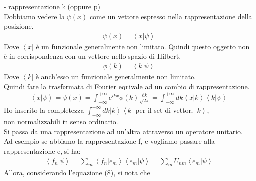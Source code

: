\begin{flushleft}
- rappresentazione k (oppure p)\\
Dobbiamo vedere la $\psi\left(x\right)$ come un vettore espresso nella rappresentazione della posizione.\\
\begin{equation}\begin{split}
\psi\left(x\right)=\left\langle x|\psi\right\rangle
\end{split}\end{equation}
Dove $\left\langle x\right|$ è un funzionale generalmente non limitato. Quindi questo oggetto non è in corrispondenza con un vettore nello spazio di Hilbert.
\begin{equation}\begin{split}
\phi \left(k\right)=\left\langle k|\psi\right\rangle
\end{split}\end{equation}
Dove $\left\langle k\right|$ è anch'esso un funzionale generalmente non limitato.\\
Quindi fare la trasformata di Fourier equivale ad un cambio di rappresentazione.
\begin{equation}\begin{split}
\left\langle x|\psi\right\rangle=\psi\left(x\right)=\int_{-\infty }^{+\infty }{e^{ikx}\phi\left(k\right) \frac{\textrm{d}k}{\sqrt{2\pi}}}=\int^{+\infty }_{-\infty } dk \left\langle x|k\right\rangle \left\langle k|\psi\right\rangle
\end{split}\end{equation}
Ho inserito la completezza $\int^{+\infty }_{-\infty } {dk \left|k\right\rangle \left\langle k\right|}$ per il set di vettori $\left|k\right\rangle$,\\ non normalizzabili in senso ordinario.\\
Si passa da una rappresentazione ad un'altra attraverso un operatore unitario.\\
Ad esempio se abbiamo la rappresentazione f, e vogliamo passare alla rappresentazione e, si ha:\\
\begin{equation}\begin{split}
\left\langle f_{n}|\psi\right\rangle=\sum_{m}\left\langle f_{n}|e_{m}\right\rangle \left\langle e_{m}|\psi\right\rangle=\sum_{m}U_{nm}\left\langle e_{m}|\psi\right\rangle
\end{split}\end{equation}
Allora, considerando l'equazione (8), si nota che 
\begin{equation}\begin{split}

\end{split}
\end{equation}
\end{flushleft}
